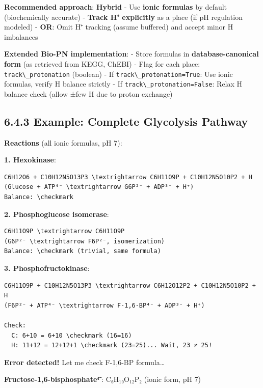 \textbf{Recommended approach}: \textbf{Hybrid} - Use \textbf{ionic
formulas} by default (biochemically accurate) - \textbf{Track H⁺
explicitly} as a place (if pH regulation modeled) - \textbf{OR}: Omit H⁺
tracking (assume buffered) and accept minor H imbalances

\textbf{Extended Bio-PN implementation}: - Store formulas in
\textbf{database-canonical form} (as retrieved from KEGG, ChEBI) - Flag
for each place: \passthrough{\lstinline!track\_protonation!} (boolean) -
If \passthrough{\lstinline!track\_protonation=True!}: Use ionic
formulas, verify H balance strictly - If
\passthrough{\lstinline!track\_protonation=False!}: Relax H balance
check (allow ±few H due to proton exchange)

\hypertarget{example-complete-glycolysis-pathway}{%
\subsection{6.4.3 Example: Complete Glycolysis
Pathway}\label{example-complete-glycolysis-pathway}}

\textbf{Reactions} (all ionic formulas, pH 7):

\textbf{1. Hexokinase}:

\begin{lstlisting}
C6H12O6 + C10H12N5O13P3 \textrightarrow C6H11O9P + C10H12N5O10P2 + H
(Glucose + ATP⁴⁻ \textrightarrow G6P²⁻ + ADP³⁻ + H⁺)
Balance: \checkmark
\end{lstlisting}

\textbf{2. Phosphoglucose isomerase}:

\begin{lstlisting}
C6H11O9P \textrightarrow C6H11O9P
(G6P²⁻ \textrightarrow F6P²⁻, isomerization)
Balance: \checkmark (trivial, same formula)
\end{lstlisting}

\textbf{3. Phosphofructokinase}:

\begin{lstlisting}
C6H11O9P + C10H12N5O13P3 \textrightarrow C6H12O12P2 + C10H12N5O10P2 + H
(F6P²⁻ + ATP⁴⁻ \textrightarrow F-1,6-BP⁴⁻ + ADP³⁻ + H⁺)

Check:
  C: 6+10 = 6+10 \checkmark (16=16)
  H: 11+12 = 12+12+1 \checkmark (23=25)... Wait, 23 ≠ 25!
\end{lstlisting}

\textbf{Error detected!} Let me check F-1,6-BP formula\ldots{}

\textbf{Fructose-1,6-bisphosphate⁴⁻}: C₆H₁₀O₁₂P₂ (ionic form, pH 7)

